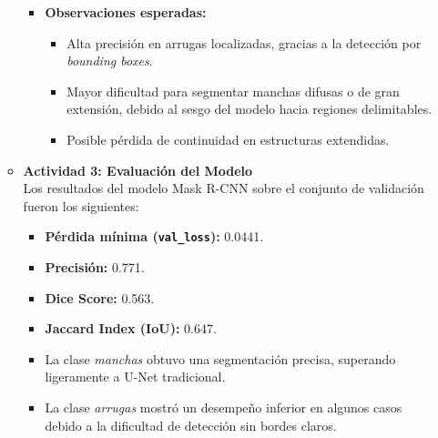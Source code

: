 \begin{enumerate}
\begin{itemize}
\begin{itemize}
      \item \textbf{Observaciones esperadas:}
      \begin{itemize}
        \item Alta precisión en arrugas localizadas, gracias a la detección por \emph{bounding boxes}.
        \item Mayor dificultad para segmentar manchas difusas o de gran extensión, debido al sesgo del modelo hacia regiones delimitables.
        \item Posible pérdida de continuidad en estructuras extendidas.
      \end{itemize}
    \end{itemize}
  
    \item \textbf{Actividad 3: Evaluación del Modelo} \\
    Los resultados del modelo Mask R-CNN sobre el conjunto de validación fueron los siguientes:
    \begin{itemize}
      \item \textbf{Pérdida mínima (\texttt{val\_loss}):} 0.0441.
      \item \textbf{Precisión:} 0.771.
      \item \textbf{Dice Score:} 0.563.
      \item \textbf{Jaccard Index (IoU):} 0.647.
      \item La clase \emph{manchas} obtuvo una segmentación precisa, superando ligeramente a U-Net tradicional.
      \item La clase \emph{arrugas} mostró un desempeño inferior en algunos casos debido a la dificultad de detección sin bordes claros.
    \end{itemize}
  
  
  
  

\end{itemize}
\end{enumerate}
